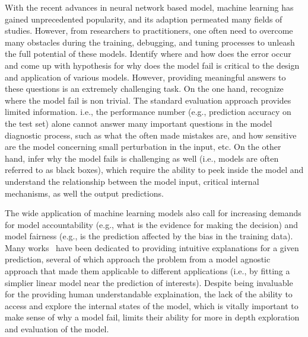 \maketitle

With the recent advances in neural network based model, machine learning has
gained unprecedented popularity, and its adaption permeated many fields of studies.
%
However, from researchers to practitioners, one often need to overcome many
obstacles during the training, debugging, and tuning processes to unleash
the full potential of these models.
%
Identify where and how does the error occur and come up with hypothesis for
why does the model fail is critical to the design and application of various models.
However, providing meaningful answers to these questions is an extremely challenging task.
On the one hand, recognize where the model fail is non trivial. The standard evaluation approach provides limited information. i.e., the performance number (e.g., prediction accuracy on the test set) alone cannot answer many important questions in the model diagnostic process, such as what the often made mistakes are, and how sensitive are the model concerning small perturbation in the input, etc. On the other hand, infer why the model fails is challenging as well (i.e., models are often referred to as black boxes),
which require the ability to peek inside the model and understand the relationship between the
model input, critical internal mechanisms, as well the output predictions.

The wide application of machine learning models also call for increasing demands for model accountability (e.g., what is the evidence for making the decision) and model fairness (e.g., is the prediction affected by the bias in the training data).
%
Many works~\cite{RibeiroSinghGuestrin2016} have been dedicated to providing intuitive explanations for a given prediction, several of which approach the problem from a model agnostic approach that made them applicable to different applications (i.e., by fitting a simplier linear model near the prediction of interests).
%
Despite being invaluable for the providing human understandable explaination, the lack of the ability to access and explore the internal states of the model, which is vitally important to make sense of why a model fail, limits their ability for more in depth exploration and evaluation of the model.

